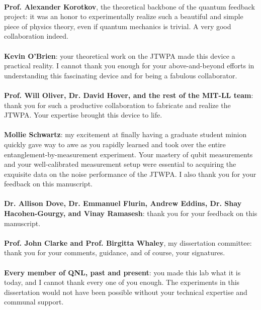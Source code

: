 \documentclass[12pt]{myucthesis}
\begin{document}
\begin{frontmatter}
\begin{acknowledgements}
\paragraph{}
\textbf{Prof. Alexander Korotkov}, the theoretical backbone of the quantum feedback project: it was an honor to experimentally realize such a beautiful and simple piece of physics theory, even if quantum mechanics is trivial.  A very good collaboration indeed.
\paragraph{}
\textbf{Kevin O'Brien}: your theoretical work on the JTWPA made this device a practical reality.  I cannot thank you enough for your above-and-beyond efforts in understanding this fascinating device and for being a fabulous collaborator.
\paragraph{}
\textbf{Prof. Will Oliver, Dr. David Hover, and the rest of the MIT-LL team}: thank you for such a productive collaboration to fabricate and realize the JTWPA.  Your expertise brought this device to life.
\paragraph{}
\textbf{Mollie Schwartz}: my excitement at finally having a graduate student minion quickly gave way to awe as you rapidly learned and took over the entire entanglement-by-measurement experiment.  Your mastery of qubit measurements and your well-calibrated measurement setup were essential to acquiring the exquisite data on the noise performance of the JTWPA.  I also thank you for your feedback on this manuscript.
\paragraph{}
\textbf{Dr. Allison Dove, Dr. Emmanuel Flurin, Andrew Eddins, Dr. Shay Hacohen-Gourgy, and Vinay Ramasesh}: thank you for your feedback on this manuscript.
\paragraph{}
\textbf{Prof. John Clarke and Prof. Birgitta Whaley}, my dissertation committee: thank you for your comments, guidance, and of course, your signatures.
\paragraph{}
\textbf{Every member of QNL, past and present}: you made this lab what it is today, and I cannot thank every one of you enough.  The experiments in this dissertation would not have been possible without your technical expertise and communal support.

\end{acknowledgements}
\end{frontmatter}
\end{document}

